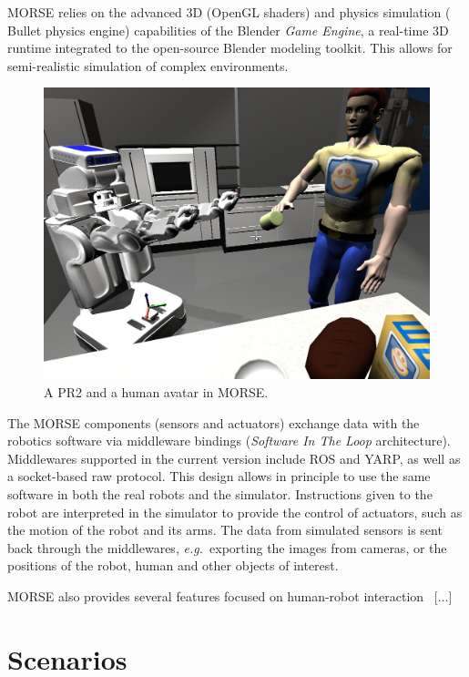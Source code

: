 \documentclass[conference]{IEEEtran}
\newcommand{\eg}{{\textit{e.g.~}}}
\begin{document}
MORSE relies on the advanced 3D (OpenGL shaders) and physics simulation ({\sc
Bullet} physics engine) capabilities of the Blender \emph{Game Engine}, a
real-time 3D runtime integrated to the open-source Blender modeling toolkit.
This allows for semi-realistic simulation of complex environments.

\begin{figure}[t]
      \centering
      \includegraphics[width=0.9\linewidth]{morse_pr2.jpg}
      \caption{A PR2 and a human avatar in MORSE.}
      \label{fig|morse-hri}
\end{figure}

The MORSE components (sensors and actuators) exchange data with the robotics
software via middleware bindings (\emph{Software In The Loop} architecture).
Middlewares supported in the current version include ROS and YARP, as well as a
socket-based raw protocol. This design allows in principle to use the same
software in both the real robots and the simulator. Instructions given to the
robot are interpreted in the simulator to provide the control of actuators, such
as the motion of the robot and its arms.  The data from simulated sensors is
sent back through the middlewares, \eg exporting the images from cameras, or the
positions of the robot, human and other objects of interest.

MORSE also provides several features focused on human-robot
interaction~\cite{lemaignan2012morse} [...]

\section{Scenarios}
\end{document}
